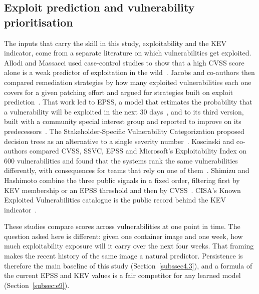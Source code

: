 \documentclass[referee,lineno,pdflatex,sn-basic]{sn-jnl}%
\theoremstyle{thmstyleone}%
\theoremstyle{thmstyletwo}%
\theoremstyle{thmstylethree}%
\begin{document}
\subsection{Exploit prediction and vulnerability prioritisation}\label{subsec:lit-epss}
The inputs that carry the skill in this study, exploitability and the KEV indicator, come from a separate literature on which vulnerabilities get exploited. Allodi and Massacci used case-control studies to show that a high CVSS score alone is a weak predictor of exploitation in the wild~\citep{allodi2014severity}. Jacobs and co-authors then compared remediation strategies by how many exploited vulnerabilities each one covers for a given patching effort and argued for strategies built on exploit prediction~\citep{jacobs2020remediation}. That work led to EPSS, a model that estimates the probability that a vulnerability will be exploited in the next 30 days~\citep{first_epss}, and to its third version, built with a community special interest group and reported to improve on its predecessors~\citep{jacobs2023epss3}. The Stakeholder-Specific Vulnerability Categorization proposed decision trees as an alternative to a single severity number~\citep{spring2021cvss}. Koscinski and co-authors compared CVSS, SSVC, EPSS and Microsoft's Exploitability Index on 600 vulnerabilities and found that the systems rank the same vulnerabilities differently, with consequences for teams that rely on one of them~\citep{koscinski2025scores}. Shimizu and Hashimoto combine the three public signals in a fixed order, filtering first by KEV membership or an EPSS threshold and then by CVSS~\citep{shimizu2026chaining}. CISA's Known Exploited Vulnerabilities catalogue is the public record behind the KEV indicator~\citep{cisa_kev}.

These studies compare scores across vulnerabilities at one point in time. The question asked here is different: given one container image and one week, how much exploitability exposure will it carry over the next four weeks. That framing makes the recent history of the same image a natural predictor. Persistence is therefore the main baseline of this study (Section~\ref{subssec4.3}), and a formula of the current EPSS and KEV values is a fair competitor for any learned model (Section~\ref{subsec:e9}).
\end{document}
